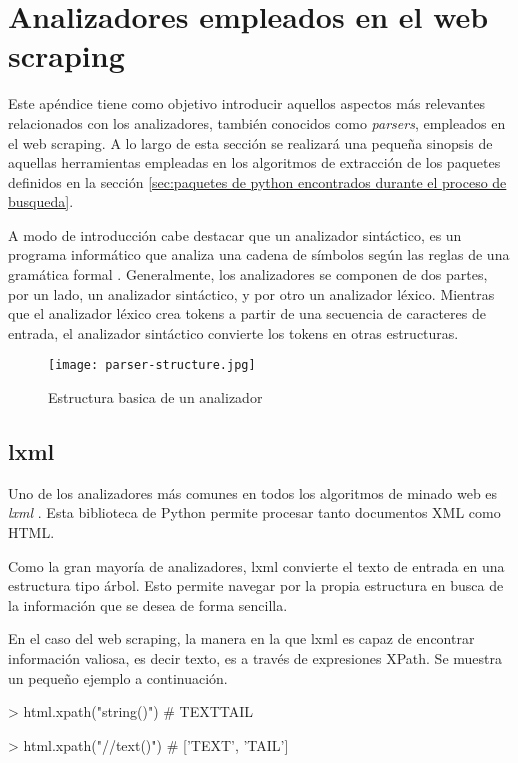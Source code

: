 \chapter{Analizadores empleados en el web scraping}
\label{cha:analizadores empleados en el web scraping}

Este apéndice tiene como objetivo introducir aquellos aspectos más relevantes relacionados con los
analizadores, también conocidos como \emph{parsers}, empleados en el web scraping. A lo largo de esta sección
se realizará una pequeña sinopsis de aquellas herramientas empleadas en los algoritmos de extracción de
los paquetes definidos en la sección \ref{sec:paquetes de python encontrados durante el proceso de 
busqueda}.

A modo de introducción cabe destacar que un analizador sintáctico, es un programa informático que analiza
una cadena de símbolos según las reglas de una gramática formal \cite{parser-wikipedia}. Generalmente, los 
analizadores se componen de dos partes, por un lado, un analizador sintáctico, y por otro un analizador 
léxico. Mientras que el analizador léxico crea tokens a partir de una secuencia de caracteres de entrada, 
el analizador sintáctico convierte los tokens en otras estructuras.

\begin{figure}[tphb]
    \centering
    \texttt{[image: parser-structure.jpg]}
    \caption{Estructura basica de un analizador}
    \label{img:estructura basica de un analizador}
\end{figure}

\section{lxml}
\label{sec:lxml}

Uno de los analizadores más comunes en todos los algoritmos de minado web es \emph{lxml} \cite{lxml}. Esta
biblioteca de Python permite procesar tanto documentos XML como HTML.

Como la gran mayoría de analizadores, lxml convierte el texto de entrada en una estructura tipo árbol. Esto
permite navegar por la propia estructura en busca de la información que se desea de forma sencilla. 

En el caso del web scraping, la manera en la que lxml es capaz de encontrar información valiosa, es decir 
texto, es a través de expresiones XPath. Se muestra un pequeño ejemplo a continuación.

\begin{Schunk}
    \begin{Soutput}
        > html.xpath("string()")
        # TEXTTAIL

        > html.xpath("//text()")
        # ['TEXT', 'TAIL']
    \end{Soutput}
\end{Schunk}

